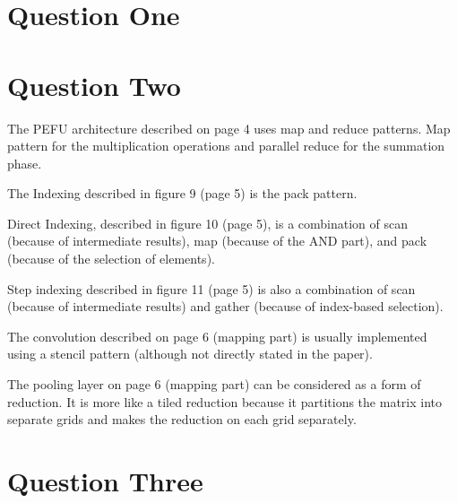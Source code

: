 \documentclass[12pt]{article}
\begin{document}
\section{Question One}

\newpage

\section{Question Two}

The PEFU architecture described on page 4 uses map and reduce patterns. Map pattern for the multiplication operations and parallel reduce for the summation phase.

The Indexing described in figure 9 (page 5) is the pack pattern.

Direct Indexing, described in figure 10 (page 5), is a combination of scan (because of intermediate results), map (because of the AND part), and pack (because of the selection of elements).

Step indexing described in figure 11 (page 5) is also a combination of scan (because of intermediate results) and gather (because of index-based selection).

The convolution described on page 6 (mapping part) is usually implemented using a stencil pattern (although not directly stated in the paper).

The pooling layer on page 6 (mapping part) can be considered as a form of reduction. It is more like a tiled reduction because it partitions the matrix into separate grids and makes the reduction on each grid separately.





\newpage



\section{Question Three}
\end{document}

